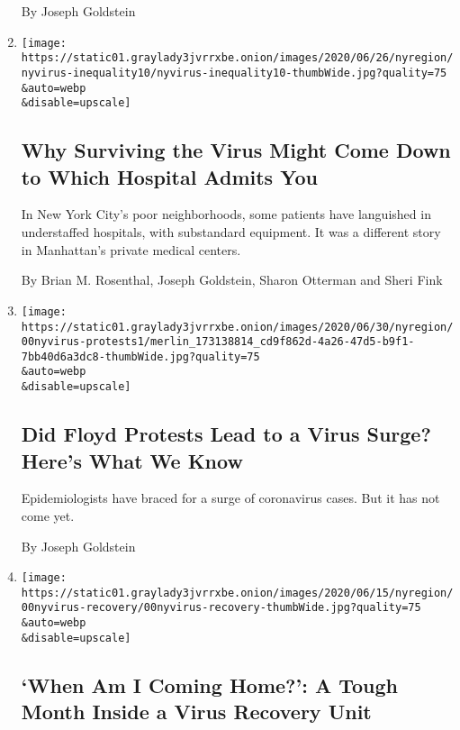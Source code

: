 \begin{enumerate}
  By Joseph Goldstein
\item
  \href{/2020/07/01/nyregion/Coronavirus-hospitals.html}{}

  \texttt{[image: https://static01.graylady3jvrrxbe.onion/images/2020/06/26/nyregion/nyvirus-inequality10/nyvirus-inequality10-thumbWide.jpg?quality=75\\\&auto=webp\\\&disable=upscale]}

  \hypertarget{why-surviving-the-virus-might-come-down-to-which-hospital-admits-you}{%
  \subsection{Why Surviving the Virus Might Come Down to Which Hospital
  Admits
  You}\label{why-surviving-the-virus-might-come-down-to-which-hospital-admits-you}}

  In New York City's poor neighborhoods, some patients have languished
  in understaffed hospitals, with substandard equipment. It was a
  different story in Manhattan's private medical centers.

  By Brian M. Rosenthal, Joseph Goldstein, Sharon Otterman and Sheri
  Fink
\item
  \href{/2020/07/01/nyregion/nyc-coronavirus-protests.html}{}

  \texttt{[image: https://static01.graylady3jvrrxbe.onion/images/2020/06/30/nyregion/00nyvirus-protests1/merlin\_173138814\_cd9f862d-4a26-47d5-b9f1-7bb40d6a3dc8-thumbWide.jpg?quality=75\\\&auto=webp\\\&disable=upscale]}

  \hypertarget{did-floyd-protests-lead-to-a-virus-surge-heres-what-we-know}{%
  \subsection{Did Floyd Protests Lead to a Virus Surge? Here's What We
  Know}\label{did-floyd-protests-lead-to-a-virus-surge-heres-what-we-know}}

  Epidemiologists have braced for a surge of coronavirus cases. But it
  has not come yet.

  By Joseph Goldstein
\item
  \href{/2020/06/17/nyregion/coronavirus-recovery-hospital.html}{}

  \texttt{[image: https://static01.graylady3jvrrxbe.onion/images/2020/06/15/nyregion/00nyvirus-recovery/00nyvirus-recovery-thumbWide.jpg?quality=75\\\&auto=webp\\\&disable=upscale]}

  \hypertarget{when-am-i-coming-home-a-tough-month-inside-a-virus-recovery-unit}{%
  \subsection{`When Am I Coming Home?': A Tough Month Inside a Virus
  Recovery
  Unit}\label{when-am-i-coming-home-a-tough-month-inside-a-virus-recovery-unit}}


\end{enumerate}
